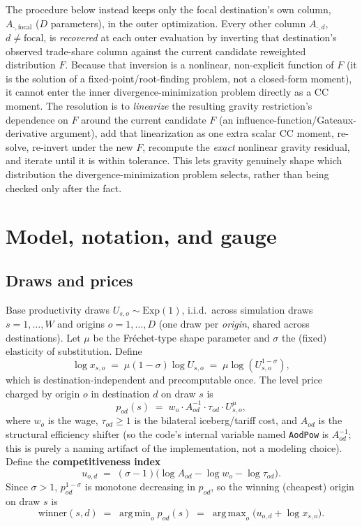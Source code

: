 \documentclass[11pt]{article}
\DeclareMathOperator*{\argmax}{arg\,max}
\DeclareMathOperator*{\argmin}{arg\,min}
\begin{document}
The procedure below instead keeps only the focal destination's own column, $A_{\cdot,\text{focal}}$
($D$ parameters), in the outer optimization. Every other column $A_{\cdot,d}$, $d\neq\text{focal}$,
is \emph{recovered} at each outer evaluation by inverting that destination's observed trade-share
column against the current candidate reweighted distribution $F$. Because that inversion is a
nonlinear, non-explicit function of $F$ (it is the solution of a fixed-point/root-finding problem,
not a closed-form moment), it cannot enter the inner divergence-minimization problem directly as a
CC moment. The resolution is to \emph{linearize} the resulting gravity restriction's dependence on
$F$ around the current candidate $F$ (an influence-function/Gateaux-derivative argument), add that
linearization as one extra scalar CC moment, re-solve, re-invert under the new $F$, recompute the
\emph{exact} nonlinear gravity residual, and iterate until it is within tolerance. This lets gravity
genuinely shape which distribution the divergence-minimization problem selects, rather than being
checked only after the fact.

\section{Model, notation, and gauge}
\label{sec:model}

\subsection{Draws and prices}
Base productivity draws $U_{s,o}\sim\mathrm{Exp}(1)$, i.i.d.\ across simulation draws $s=1,\dots,W$
and origins $o=1,\dots,D$ (one draw per \emph{origin}, shared across destinations). Let $\mu$ be the
Fréchet-type shape parameter and $\sigma$ the (fixed) elasticity of substitution. Define
\[
\log x_{s,o} \;=\; \mu(1-\sigma)\log U_{s,o} \;=\; \mu \log(U_{s,o}^{1-\sigma}),
\]
which is destination-independent and precomputable once. The level price charged by origin $o$ in
destination $d$ on draw $s$ is
\[
p_{od}(s) \;=\; w_o \cdot A_{od}^{-1}\cdot \tau_{od}\cdot U_{s,o}^{\mu},
\]
where $w_o$ is the wage, $\tau_{od}\geq 1$ is the bilateral iceberg/tariff cost, and $A_{od}$ is the
structural efficiency shifter (so the code's internal variable named \texttt{AodPow} is $A_{od}^{-1}$;
this is purely a naming artifact of the implementation, not a modeling choice). Define the
\textbf{competitiveness index}
\[
u_{o,d} \;=\; (\sigma-1)\Big(\log A_{od} - \log w_o - \log \tau_{od}\Big).
\]
Since $\sigma>1$, $p_{od}^{1-\sigma}$ is monotone decreasing in $p_{od}$, so the winning (cheapest)
origin on draw $s$ is
\[
\text{winner}(s,d) \;=\; \argmin_o p_{od}(s) \;=\; \argmax_o\big(u_{o,d}+\log x_{s,o}\big).
\]
\end{document}
